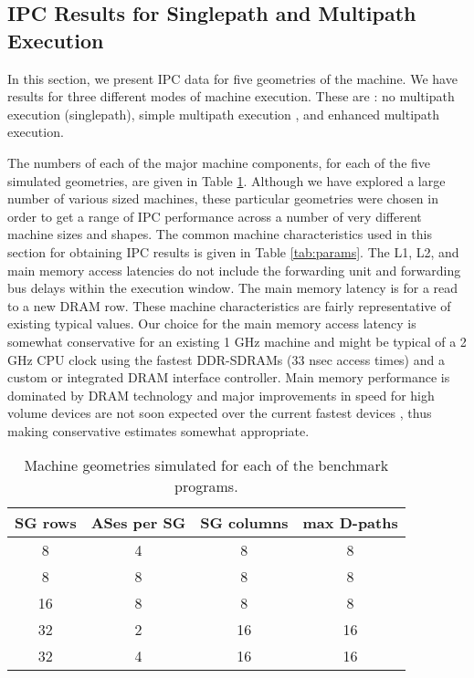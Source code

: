 \documentclass[10pt,dvips]{article}
\begin{document}
\subsection{IPC Results for Singlepath and Multipath Execution}
%
In this section, we present IPC data for five geometries
of the machine.  We have results for three different 
modes of 
machine execution.  These are : no multipath execution (singlepath),
simple multipath execution , and enhanced multipath execution.

The numbers of each of the major machine components, for each of the 
five
simulated geometries, are given in Table \ref{tab:configs}.
Although we have explored a large number of various sized
machines, these particular geometries were chosen in order
to get a range of IPC performance across a number of very
different machine sizes and shapes.
The common machine characteristics used in this section for
obtaining IPC results is given in Table \ref{tab:params}.
The L1, L2, and main memory access latencies do not include
the forwarding unit and forwarding bus delays within the
execution window.
The main memory latency is for a read to a new DRAM row.
These machine characteristics are fairly representative of
existing typical values.  Our choice for the main memory
access latency is somewhat conservative for an existing
1 GHz machine and might be typical of a 2 GHz CPU clock using
the fastest DDR-SDRAMs (33 nsec access times) and a custom or integrated 
DRAM interface controller.
Main memory performance is dominated
by DRAM technology and major improvements in speed for high volume
devices are not soon
expected over the current fastest devices \cite{Sam99},
thus making conservative estimates somewhat appropriate.
%
\begin{table}
\begin{center}
\caption{Machine geometries simulated for each of the benchmark
programs.}
\label{tab:configs}
\begin{tabular}{|c|c|c|c|}
\hline 
SG rows&
ASes per SG&
SG columns&
max D-paths\\
\hline
\hline 
8&4&8&8\\
\hline 
8&8&8&8\\
\hline 
16&8&8&8\\
\hline 
32&2&16&16\\
\hline 
32&4&16&16\\
\hline
\end{tabular}
\end{center}
\end{table}
%
\end{document}
